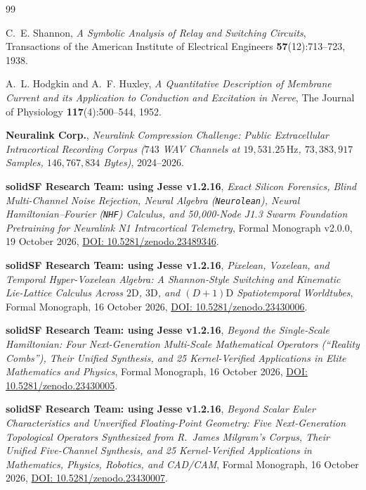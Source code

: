 \documentclass[11pt,letterpaper]{article}
\theoremstyle{definition}
\begin{document}
\begin{thebibliography}{99}
\small

C.~E. Shannon, \emph{A Symbolic Analysis of Relay and Switching Circuits}, Transactions of the American Institute of Electrical Engineers \textbf{57}(12):713--723, 1938.

A.~L. Hodgkin and A.~F. Huxley, \emph{A Quantitative Description of Membrane Current and its Application to Conduction and Excitation in Nerve}, The Journal of Physiology \textbf{117}(4):500--544, 1952.

\textbf{Neuralink Corp.}, \emph{Neuralink Compression Challenge: Public Extracellular Intracortical Recording Corpus ($743$ WAV Channels at $19{,}531.25\,\text{Hz}$, $73{,}383{,}917$ Samples, $146{,}767{,}834$ Bytes)}, 2024--2026.

\textbf{solidSF Research Team: using Jesse v1.2.16}, \emph{Exact Silicon Forensics, Blind Multi-Channel Noise Rejection, Neural Algebra (\texttt{Neurolean}), Neural Hamiltonian--Fourier (\texttt{NHF}) Calculus, and 50,000-Node J1.3 Swarm Foundation Pretraining for Neuralink N1 Intracortical Telemetry}, Formal Monograph v2.0.0, 19 October 2026, \href{https://doi.org/10.5281/zenodo.23489346}{DOI: 10.5281/zenodo.23489346}.

\textbf{solidSF Research Team: using Jesse v1.2.16}, \emph{Pixelean, Voxelean, and Temporal Hyper-Voxelean Algebra: A Shannon-Style Switching and Kinematic Lie-Lattice Calculus Across $2\text{D}$, $3\text{D}$, and $(D+1)\text{D}$ Spatiotemporal Worldtubes}, Formal Monograph, 16 October 2026, \href{https://doi.org/10.5281/zenodo.23430006}{DOI: 10.5281/zenodo.23430006}.

\textbf{solidSF Research Team: using Jesse v1.2.16}, \emph{Beyond the Single-Scale Hamiltonian: Four Next-Generation Multi-Scale Mathematical Operators (``Reality Combs''), Their Unified Synthesis, and 25 Kernel-Verified Applications in Elite Mathematics and Physics}, Formal Monograph, 16 October 2026, \href{https://doi.org/10.5281/zenodo.23430005}{DOI: 10.5281/zenodo.23430005}.

\textbf{solidSF Research Team: using Jesse v1.2.16}, \emph{Beyond Scalar Euler Characteristics and Unverified Floating-Point Geometry: Five Next-Generation Topological Operators Synthesized from R.\ James Milgram's Corpus, Their Unified Five-Channel Synthesis, and 25 Kernel-Verified Applications in Mathematics, Physics, Robotics, and CAD/CAM}, Formal Monograph, 16 October 2026, \href{https://doi.org/10.5281/zenodo.23430007}{DOI: 10.5281/zenodo.23430007}.


\end{thebibliography}
\end{document}
